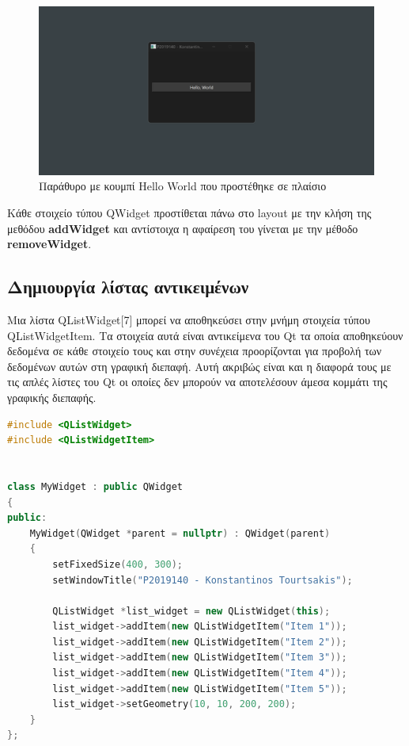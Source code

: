 \begin{figure}[H]
    \centering
    \includegraphics[width=1.0\textwidth]{./images/QVBoxLayout.png}
    \caption{Παράθυρο με κουμπί Hello World που προστέθηκε σε πλαίσιο}
\end{figure}


Κάθε στοιχείο τύπου QWidget προστίθεται πάνω στο layout με την κλήση της μεθόδου
\textbf{addWidget} και αντίστοιχα η αφαίρεση του γίνεται με την μέθοδο \textbf{removeWidget}.

\subsection{Δημιουργία λίστας αντικειμένων}
Μια λίστα QListWidget[7] μπορεί να αποθηκεύσει στην μνήμη στοιχεία τύπου QListWidgetItem.
Τα στοιχεία αυτά είναι αντικείμενα του Qt τα οποία αποθηκεύουν δεδομένα σε κάθε στοιχείο
τους και στην συνέχεια προορίζονται για προβολή των δεδομένων αυτών στη γραφική διεπαφή.
Αυτή ακριβώς είναι και η διαφορά τους με τις απλές λίστες του Qt οι οποίες δεν μπορούν να
αποτελέσουν άμεσα κομμάτι της γραφικής διεπαφής. 


\begin{lstlisting}[language=C++, style=cppstyle]
#include <QListWidget>
#include <QListWidgetItem>


class MyWidget : public QWidget 
{
public:
    MyWidget(QWidget *parent = nullptr) : QWidget(parent) 
    {
        setFixedSize(400, 300);
        setWindowTitle("P2019140 - Konstantinos Tourtsakis");

        QListWidget *list_widget = new QListWidget(this);
        list_widget->addItem(new QListWidgetItem("Item 1"));
        list_widget->addItem(new QListWidgetItem("Item 2"));
        list_widget->addItem(new QListWidgetItem("Item 3"));
        list_widget->addItem(new QListWidgetItem("Item 4"));
        list_widget->addItem(new QListWidgetItem("Item 5"));
        list_widget->setGeometry(10, 10, 200, 200);
    }
};
\end{lstlisting}


